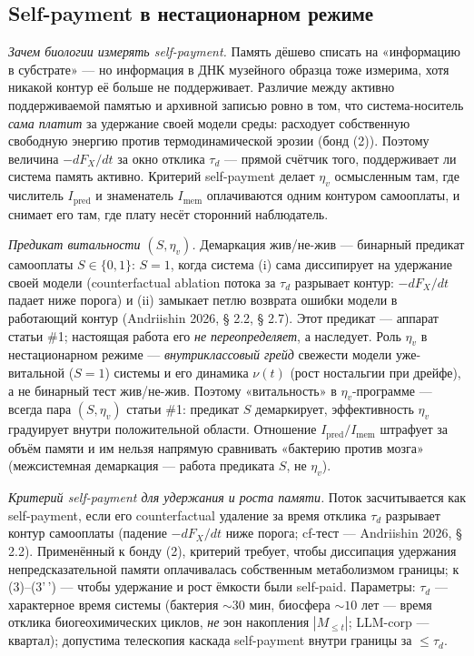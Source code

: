 \documentclass[pdflatex,sn-mathphys-ay]{sn-jnl}
\begin{document}
\subsection{Self-payment в нестационарном режиме}\label{self-payment-ux432-ux43dux435ux441ux442ux430ux446ux438ux43eux43dux430ux440ux43dux43eux43c-ux440ux435ux436ux438ux43cux435}



\emph{Зачем биологии измерять self-payment.} Память дёшево списать на «информацию в субстрате» --- но информация в ДНК музейного образца тоже измерима, хотя никакой контур её больше не поддерживает. Различие между активно поддерживаемой памятью и архивной записью ровно в том, что система-носитель \emph{сама платит} за удержание своей модели среды: расходует собственную свободную энергию против термодинамической эрозии (бонд (2)). Поэтому величина \(-dF_X/dt\) за окно отклика \(\tau_d\) --- прямой счётчик того, поддерживает ли система память активно. Критерий self-payment делает \(\eta_v\) осмысленным там, где числитель \(I_{\text{pred}}\) и знаменатель \(I_{\text{mem}}\) оплачиваются одним контуром самооплаты, и снимает его там, где плату несёт сторонний наблюдатель.



\emph{Предикат витальности \((S, \eta_v)\).} Демаркация жив/не-жив --- бинарный предикат самооплаты \(S \in \{0,1\}\): \(S = 1\), когда система (i) сама диссипирует на удержание своей модели (counterfactual ablation потока за \(\tau_d\) разрывает контур: \(-dF_X/dt\) падает ниже порога) и (ii) замыкает петлю возврата ошибки модели в работающий контур (Andriishin 2026, § 2.2, § 2.7). Этот предикат --- аппарат статьи \#1; настоящая работа его \emph{не переопределяет}, а наследует. Роль \(\eta_v\) в нестационарном режиме --- \emph{внутриклассовый грейд} свежести модели уже-витальной (\(S = 1\)) системы и его динамика \(\nu(t)\) (рост ностальгии при дрейфе), а не бинарный тест жив/не-жив. Поэтому «витальность» в \(\eta_v\)-программе --- всегда пара \((S, \eta_v)\) статьи \#1: предикат \(S\) демаркирует, эффективность \(\eta_v\) градуирует внутри положительной области. Отношение \(I_{\text{pred}}/I_{\text{mem}}\) штрафует за объём памяти и им нельзя напрямую сравнивать «бактерию против мозга» (межсистемная демаркация --- работа предиката \(S\), не \(\eta_v\)).



\emph{Критерий self-payment для удержания и роста памяти.} Поток засчитывается как self-payment, если его counterfactual удаление за время отклика \(\tau_d\) разрывает контур самооплаты (падение \(-dF_X/dt\) ниже порога; cf-тест --- Andriishin 2026, § 2.2). Применённый к бонду (2), критерий требует, чтобы диссипация удержания непредсказательной памяти оплачивалась собственным метаболизмом границы; к (3)--(3'\,') --- чтобы удержание и рост ёмкости были self-paid. Параметры: \(\tau_d\) --- характерное время системы (бактерия \(\sim 30\) мин, биосфера \(\sim 10\) лет --- время отклика биогеохимических циклов, \emph{не} эон накопления \(|M_{\le t}|\); LLM-corp --- квартал); допустима телескопия каскада self-payment внутри границы за \(\le \tau_d\).
\end{document}

